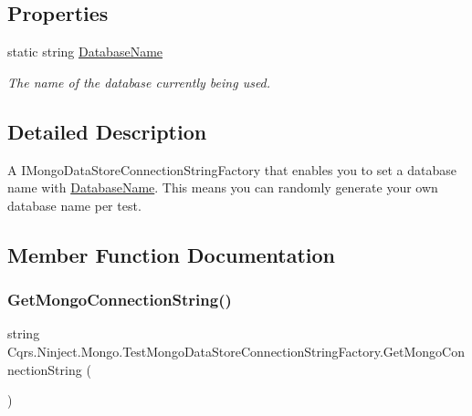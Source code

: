 \subsection*{Properties}
\begin{DoxyCompactItemize}
\item 
static string \hyperlink{classCqrs_1_1Ninject_1_1Mongo_1_1TestMongoDataStoreConnectionStringFactory_a911d570725e6702a9c1d16321202d89f_a911d570725e6702a9c1d16321202d89f}{Database\+Name}
\begin{DoxyCompactList}\small\item\em The name of the database currently being used. \end{DoxyCompactList}\end{DoxyCompactItemize}


\subsection{Detailed Description}
A I\+Mongo\+Data\+Store\+Connection\+String\+Factory that enables you to set a database name with \hyperlink{classCqrs_1_1Ninject_1_1Mongo_1_1TestMongoDataStoreConnectionStringFactory_a911d570725e6702a9c1d16321202d89f_a911d570725e6702a9c1d16321202d89f}{Database\+Name}. This means you can randomly generate your own database name per test. 



\subsection{Member Function Documentation}
\mbox{\label{classCqrs_1_1Ninject_1_1Mongo_1_1TestMongoDataStoreConnectionStringFactory_ae23b67139698984823fa7c250dcca47a_ae23b67139698984823fa7c250dcca47a}} 
\subsubsection{\texorpdfstring{Get\+Mongo\+Connection\+String()}{GetMongoConnectionString()}}
{\footnotesize\ttfamily string Cqrs.\+Ninject.\+Mongo.\+Test\+Mongo\+Data\+Store\+Connection\+String\+Factory.\+Get\+Mongo\+Connection\+String (\begin{DoxyParamCaption}{ }\end{DoxyParamCaption})}



